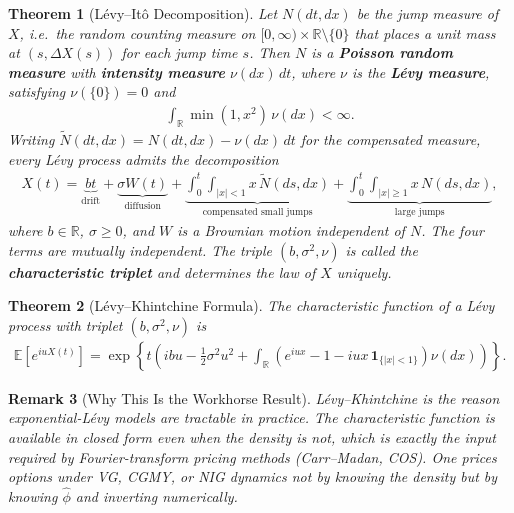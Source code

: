 \documentclass{report}
\theoremstyle{spacedplain}
\newtheorem{theorem}{Theorem}[section]
\theoremstyle{spaceddefinition}
\theoremstyle{spacedremark}
\newtheorem{remark}[theorem]{Remark}
\begin{document}
\begin{theorem}[L\'evy--It\^o Decomposition]
Let $N(dt, dx)$ be the jump measure of $X$, i.e.\ the random counting measure on $[0,\infty) \times \mathbb{R}\setminus\{0\}$ that places a unit mass at $(s, \Delta X(s))$ for each jump time $s$. Then $N$ is a \textbf{Poisson random measure} with \textbf{intensity measure} $\nu(dx)\,dt$, where $\nu$ is the \textbf{L\'evy measure}, satisfying $\nu(\{0\}) = 0$ and
\begin{align}
    \int_{\mathbb{R}} \min(1, x^2)\, \nu(dx) < \infty.
\end{align}
Writing $\widetilde{N}(dt,dx) = N(dt,dx) - \nu(dx)\,dt$ for the compensated measure, every L\'evy process admits the decomposition
\begin{align}
    X(t) = \underbrace{bt}_{\text{drift}} + \underbrace{\sigma W(t)}_{\text{diffusion}} + \underbrace{\int_0^t\!\!\int_{|x| < 1} x\, \widetilde{N}(ds, dx)}_{\text{compensated small jumps}} + \underbrace{\int_0^t\!\!\int_{|x| \geq 1} x\, N(ds, dx)}_{\text{large jumps}},
\end{align}
where $b \in \mathbb{R}$, $\sigma \geq 0$, and $W$ is a Brownian motion independent of $N$. The four terms are mutually independent. The triple $(b, \sigma^2, \nu)$ is called the \textbf{characteristic triplet} and determines the law of $X$ uniquely.
\end{theorem}

\begin{theorem}[L\'evy--Khintchine Formula]
The characteristic function of a L\'evy process with triplet $(b,\sigma^2,\nu)$ is
\begin{align}
    \mathbb{E}\!\left[e^{iuX(t)}\right] = \exp\left\{ t\left( ibu - \tfrac{1}{2}\sigma^2 u^2 + \int_{\mathbb{R}} \left( e^{iux} - 1 - iux\,\mathbf{1}_{\{|x|<1\}} \right) \nu(dx) \right) \right\}.
\end{align}
\end{theorem}

\begin{remark}[Why This Is the Workhorse Result]
L\'evy--Khintchine is the reason exponential-L\'evy models are tractable in practice. The characteristic function is available in closed form even when the density is not, which is exactly the input required by Fourier-transform pricing methods (Carr--Madan, COS). One prices options under VG, CGMY, or NIG dynamics not by knowing the density but by knowing $\hat{\phi}$ and inverting numerically.
\end{remark}
\end{document}
